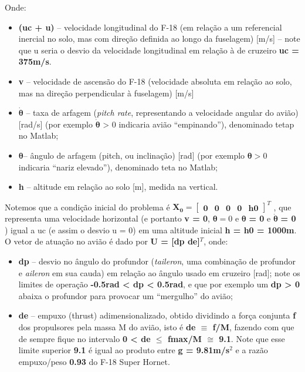 \documentclass[a4paper, 12pt]{article}
\begin{document}
Onde:

\begin{itemize}
    \item \textbf{(uc + u)} – velocidade longitudinal do F-18 (em relação a um referencial inercial no  solo, mas com direção definida ao longo da fuselagem) [m/s] – note que u seria o desvio da velocidade longitudinal em relação à de cruzeiro \textbf{uc = 375m/s}.
    \item \textbf{v} – velocidade de ascensão do F-18 (velocidade absoluta em relação ao solo, mas na  direção perpendicular à fuselagem) [m/s]
    \item $\boldsymbol{\dot \theta}$ – taxa de arfagem (\textit{pitch rate}, representando a velocidade angular do avião) [rad/s] 
    (por exemplo $\boldsymbol{\dot \theta}$ > 0 indicaria avião “empinando”), denominado tetap no Matlab;
    \item $\boldsymbol{\theta}$– ângulo de arfagem (pitch, ou inclinação) [rad] (por exemplo $\boldsymbol{\theta} > 0$ indicaria “nariz elevado”), denominado teta no Matlab;
    \item \textbf{h} – altitude em relação ao solo [m], medida na vertical.
\end{itemize}

Notemos que a condição inicial do problema é 
 $\mathbf{X_0} = \begin{bmatrix}
     \boldsymbol{0} & \boldsymbol{0} & \boldsymbol{0} & \boldsymbol{0} & \mathbf{h0} 
 \end{bmatrix}^T$
, que representa uma 
velocidade horizontal (e portanto \textbf{v = 0}, $\boldsymbol{\theta}= 0$ e $\boldsymbol{\theta}$ \textbf{= 0} e $\boldsymbol{\dot\theta}$ \textbf{= 0} ) igual a uc (e assim o desvio u = 0) em 
uma altitude inicial \textbf{h = h0 = 1000m}.\\

O vetor de atuação no avião é dado por \textbf{U = [dp de]$^T$}, onde:

\begin{itemize}
    \item \textbf{dp} – desvio no ângulo do profundor (\textit{taileron}, uma combinação de profundor e \textit{aileron} em sua cauda) em relação ao ângulo usado em cruzeiro [rad]; note os limites de operação \textbf{-0.5rad < dp < 0.5rad}, e que por exemplo um \textbf{dp > 0} abaixa o profundor  para provocar um “mergulho” do avião;
    \item \textbf{de }– empuxo (thrust) adimensionalizado, obtido dividindo a força conjunta\textbf{ f} dos  propulsores pela massa M do avião, isto é \textbf{de $\equiv$ f/M}, fazendo com que de sempre  fique no intervalo \textbf{0 < de $\leq$ fmax/M $\cong$ 9.1}. Note que esse limite superior \textbf{9.1} é igual ao  produto entre \textbf{g = 9.81m/s$^2$} e a razão empuxo/peso \textbf{0.93} do F-18 Super Hornet.
\end{itemize}
\end{document}
